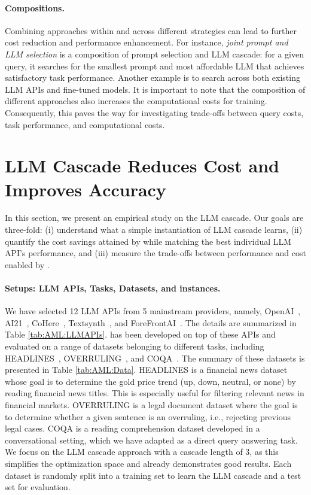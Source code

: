 \documentclass{article}
\begin{document}
\paragraph{Compositions.} Combining approaches within and across different strategies can lead to further cost reduction and performance enhancement. For instance, \textit{joint prompt and LLM selection} is a composition of prompt selection and LLM cascade: for a given query, it searches for the smallest prompt and most affordable LLM that achieves satisfactory task performance. Another example is to search across both existing LLM APIs and fine-tuned models. It is important to note that the composition of different approaches also increases the computational costs for training. Consequently, this paves the way for investigating trade-offs between query costs, task performance, and computational costs.


\section{LLM Cascade Reduces Cost and Improves Accuracy}\label{sec:AML:Experiment}
In this section, we present an empirical study on the \systemFGPT{} LLM cascade. Our goals are three-fold: (i) understand what a simple instantiation of LLM cascade learns, (ii) quantify the cost savings attained by \systemFGPT{} while matching the best individual LLM API's performance, and (iii) measure the trade-offs between performance and cost enabled by \systemFGPT{}.

\paragraph{Setups: LLM APIs, Tasks, Datasets, and \systemFGPT{} instances.}
We have selected 12 LLM APIs from 5 mainstream providers, namely, OpenAI~\cite{OpenAIAPI}, AI21~\cite{AI21API}, CoHere~\cite{CoHereAPI}, Textsynth~\cite{TextsynthAPI}, and ForeFrontAI~\cite{FFAIAPI}. The details are summarized in Table \ref{tab:AML:LLMAPIs}. \systemFGPT{} has been developed on top of these APIs and evaluated on a range of datasets belonging to different tasks, including HEADLINES~\cite{sinha2021impact}, OVERRULING~\cite{zheng2021does}, and COQA~\cite{reddy2019coqa}. The summary of these datasets is presented in Table \ref{tab:AML:Data}.
HEADLINES is a financial news dataset whose goal is to determine the gold price trend (up, down, neutral, or none) by reading financial news titles. This is especially useful for filtering relevant news in financial markets. OVERRULING is a legal document dataset where the goal is to determine whether a given sentence is an overruling, i.e., rejecting previous legal cases. COQA is a reading comprehension dataset developed in a conversational setting, which we have adapted as a direct query answering task.
We focus on the LLM cascade approach with a cascade length of 3, as this simplifies the optimization space and already demonstrates good results. Each dataset is randomly split into a training set to learn the LLM cascade and a test set for evaluation. 
\end{document}
